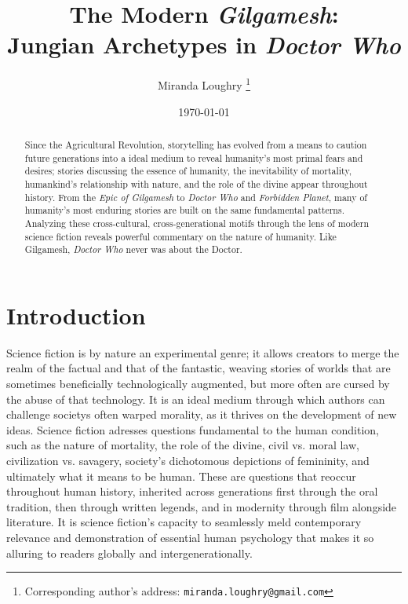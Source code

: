 \documentclass[10pt,a4paper]{article}
\begin{document}
\title{The Modern \emph{Gilgamesh}: \\
Jungian Archetypes in \emph{Doctor Who}}

\author{Miranda Loughry%
\thanks{Corresponding author's address: \texttt{miranda.loughry@gmail.com}}}

\date{\today}

\maketitle

\begin{abstract}
Since the Agricultural Revolution, storytelling
has evolved from a means to caution future
generations into a ideal medium to reveal
humanity's most primal fears and desires;
stories discussing the essence of humanity,
the inevitability of mortality, humankind's
relationship with nature, and the role of the
divine appear throughout history. From the
\emph{Epic of Gilgamesh} to \emph{Doctor Who}
and \emph{Forbidden Planet}, many of humanity's
most enduring stories are built on the same
fundamental patterns. Analyzing these
cross-cultural, cross-generational motifs
through the lens of modern science fiction
reveals powerful commentary on the nature of
humanity. Like Gilgamesh, \emph{Doctor Who}
never was about the Doctor.
\end{abstract}

\section{Introduction}
Science fiction is by nature an experimental genre; it allows creators to merge the realm of the factual and that of the fantastic, weaving stories of worlds that are sometimes beneficially technologically augmented, but more often are cursed by the abuse of that technology. It is an ideal medium through which authors can challenge societys often warped morality, as it thrives on the development of new ideas. Science fiction adresses questions fundamental to the human condition, such as the nature of mortality, the role of the divine, civil vs. moral law, civilization vs. savagery, society’s dichotomous depictions of femininity, and ultimately what it means to be human. These are questions that reoccur throughout human history, inherited across generations first through the oral tradition, then through written legends, and in modernity through film alongside literature. It is science fiction’s capacity to seamlessly meld contemporary relevance and demonstration of essential human psychology that makes it so alluring to readers globally and intergenerationally.
\end{document}
